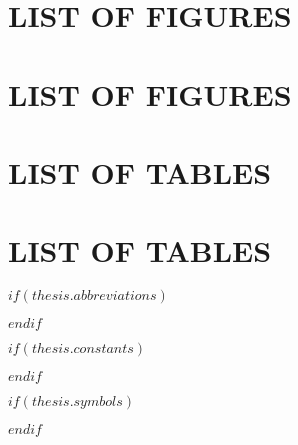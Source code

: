 \renewcommand{\listfigurename}{LIST OF FIGURES}
\patchcmd{\listoffigures}
  {\chapter*{\listfigurename}}
  {\chapter*{\bfseries\Large \listfigurename}}
  {}{}
	\listoffigures
\renewcommand{\listtablename}{LIST OF TABLES}
\patchcmd{\listoftables}
  {\chapter*{\listtablename}}
  {\chapter*{\bfseries\Large \listtablename}}
  {}{}
\listoftables
%
%
%

\endgroup


$if(thesis.abbreviations)$
\begingroup
\renewcommand{\chapteralign}{\centering}

\endgroup
$endif$

$if(thesis.constants)$



$endif$

$if(thesis.symbols)$
\begingroup
\renewcommand{\chapteralign}{\centering}

\endgroup
$endif$


\begingroup
\hypersetup{linkcolor=$if(toclinkcolor)$$toclinkcolor$$else$black$endif$}
	\renewcommand{\chapteralign}{\centering}
	\renewcommand{\chapterfont}{\bfseries\Large}

  \renewcommand{\contentsname}{CONTENTS}
  \tableofcontents

